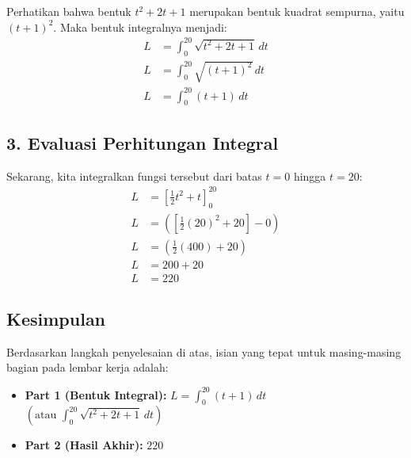 \documentclass[12pt,a4paper]{article}
\begin{document}
Perhatikan bahwa bentuk $t^2 + 2t + 1$ merupakan bentuk kuadrat sempurna, yaitu $(t + 1)^2$. Maka bentuk integralnya menjadi:
\begin{align*}
  L &= \int_{0}^{20} \sqrt{t^2 + 2t + 1} \, dt \\
  L &= \int_{0}^{20} \sqrt{(t + 1)^2} \, dt \\
  L &= \int_{0}^{20} (t + 1) \, dt
\end{align*}

\subsection*{3. Evaluasi Perhitungan Integral}
Sekarang, kita integralkan fungsi tersebut dari batas $t = 0$ hingga $t = 20$:
\begin{align*}
  L &= \left[ \frac{1}{2}t^2 + t \right]_{0}^{20} \\
  L &= \left( \left[ \frac{1}{2}(20)^2 + 20 \right] - 0 \right) \\
  L &= \left( \frac{1}{2}(400) + 20 \right) \\
  L &= 200 + 20 \\
  L &= 220
\end{align*}

\subsection*{Kesimpulan}
Berdasarkan langkah penyelesaian di atas, isian yang tepat untuk masing-masing bagian pada lembar kerja adalah:
\begin{itemize}
  \item \textbf{Part 1 (Bentuk Integral):} $L = \int_{0}^{20} (t + 1) \, dt$ \quad $\left(\text{atau } \int_{0}^{20} \sqrt{t^2 + 2t + 1} \, dt\right)$
  \item \textbf{Part 2 (Hasil Akhir):} \textbf{$220$}
\end{itemize}
\end{document}
